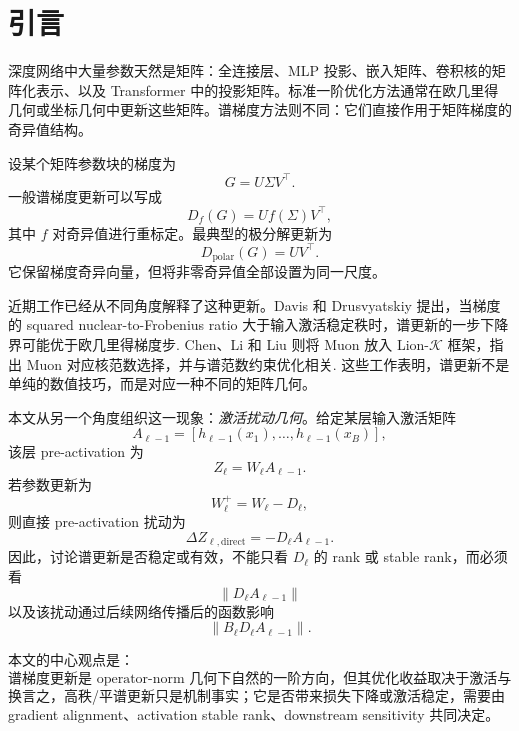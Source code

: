 \section{引言}

深度网络中大量参数天然是矩阵：全连接层、MLP 投影、嵌入矩阵、卷积核的矩阵化表示、以及 Transformer 中的投影矩阵。标准一阶优化方法通常在欧几里得几何或坐标几何中更新这些矩阵。谱梯度方法则不同：它们直接作用于矩阵梯度的奇异值结构。

设某个矩阵参数块的梯度为
\[
G=U\Sigma V^\top.
\]
一般谱梯度更新可以写成
\[
D_f(G)=Uf(\Sigma)V^\top,
\]
其中 \(f\) 对奇异值进行重标定。最典型的极分解更新为
\[
D_{\mathrm{polar}}(G)=UV^\top.
\]
它保留梯度奇异向量，但将非零奇异值全部设置为同一尺度。

近期工作已经从不同角度解释了这种更新。Davis 和 Drusvyatskiy 提出，当梯度的 squared nuclear-to-Frobenius ratio 大于输入激活稳定秩时，谱更新的一步下降界可能优于欧几里得梯度步\citep{davis2026spectral}. Chen、Li 和 Liu 则将 Muon 放入 Lion-\(\mathcal K\) 框架，指出 Muon 对应核范数选择，并与谱范数约束优化相关\citep{chen2025muon}. 这些工作表明，谱更新不是单纯的数值技巧，而是对应一种不同的矩阵几何。

本文从另一个角度组织这一现象：\emph{激活扰动几何}。给定某层输入激活矩阵
\[
A_{\ell-1}=[h_{\ell-1}(x_1),\ldots,h_{\ell-1}(x_B)],
\]
该层 pre-activation 为
\[
Z_\ell=W_\ell A_{\ell-1}.
\]
若参数更新为
\[
W_\ell^+=W_\ell-D_\ell,
\]
则直接 pre-activation 扰动为
\[
\Delta Z_{\ell,\mathrm{direct}}=-D_\ell A_{\ell-1}.
\]
因此，讨论谱更新是否稳定或有效，不能只看 \(D_\ell\) 的 rank 或 stable rank，而必须看
\[
\|D_\ell A_{\ell-1}\|
\]
以及该扰动通过后续网络传播后的函数影响
\[
\|B_\ell D_\ell A_{\ell-1}\|.
\]

本文的中心观点是：
\[
\boxed{\text{谱梯度更新是 operator-norm 几何下自然的一阶方向，但其优化收益取决于激活与下游 Jacobian 的几何。}}
\]
换言之，高秩/平谱更新只是机制事实；它是否带来损失下降或激活稳定，需要由 gradient alignment、activation stable rank、downstream sensitivity 共同决定。
